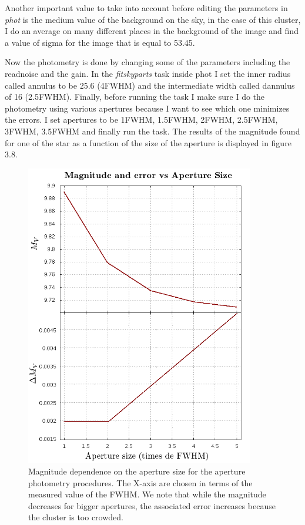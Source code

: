 Another important value to take into account before editing the parameters in \textit{phot} is the medium value of the background on the sky, in the case of this cluster, I do an average on many different places in the background of the image and find a value of sigma for the image that is equal to 53.45.

Now the photometry is done by changing some of the parameters including the readnoise and the gain. In the \textit{fitskyparts} task inside phot I set the inner radius called annulus to be 25.6 (4FWHM) and the intermediate width called dannulus of 16 (2.5FWHM). Finally, before running the task I make sure I do the photometry using various apertures because I want to see which one minimizes the errors. I set apertures to be 1FWHM, 1.5FWHM, 2FWHM, 2.5FWHM, 3FWHM, 3.5FWHM and finally run the task. The results of the magnitude found for one of the star as a function of the size of the aperture is displayed in figure 3.8.

\begin{figure}[H]
\centering
\includegraphics[width=10cm]{images/aperture_size.png}
\caption[Photometry results of Magnitudes vs Size of apertures]{Magnitude dependence on the aperture size for the aperture photometry procedures. The X-axis are chosen in terms of the measured value of the FWHM. We note that while the magnitude decreases for bigger apertures, the associated error increases because the cluster is too crowded.}
\end{figure}

